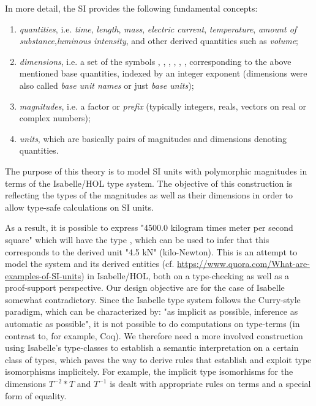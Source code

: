 \documentclass[11pt,a4paper]{book}
\begin{document}
In more detail, the SI provides the following fundamental concepts:

%
\begin{enumerate}%
\item \emph{quantities}, i.e. \emph{time}, \emph{length}, \emph{mass}, \emph{electric current},
\emph{temperature}, \emph{amount of substance},\emph{luminous intensity},
and other derived quantities such as \emph{volume};

\item \emph{dimensions}, i.e. a set of the symbols  , , , ,  \isa{{\isasymTheta}}, ,   corresponding
to the above mentioned base quantities,  indexed by an integer exponent
(dimensions were also called \emph{base unit names} or just \emph{base units});

\item \emph{magnitudes}, i.e. a factor or \emph{prefix}
(typically integers, reals, vectors on real or complex numbers);

\item \emph{units}, which are basically pairs of magnitudes and dimensions denoting quantities.
\end{enumerate}


The purpose of this theory is to model SI units with polymorphic magnitudes in terms of the
Isabelle/HOL\cite{nipkow.ea:isabelle:2002} type system. The objective of this construction is 
reflecting the types of the magnitudes as well as their dimensions in order to allow type-safe 
calculations on SI units.

As a result, it is possible to express "4500.0 kilogram times meter per second square" which will
have the type , which can be used to infer 
that this corresponds to the derived unit "4.5 kN" (kilo-Newton).  %
%
This is an attempt to model the system and its derived entities (cf.
\url{https://www.quora.com/What-are-examples-of-SI-units}) in Isabelle/HOL,
both on a type-checking as well as a proof-support perspective.
Our design objective are for the case of Isabelle somewhat contradictory.
Since the Isabelle type system follows the Curry-style paradigm, which can be 
characterized by: "as implicit as possible, inference as automatic as possible", it is not
possible to do computations on type-terms (in contrast to, for example, Coq). We therefore
need a more involved construction using Isabelle's type-classes to establish a semantic 
interpretation on a certain class of types, which paves the way to derive rules that
establish and exploit type isomorphisms implicitely. For example, the implicit
type isomorhisms for the dimensions $T^{-2} * T$ and $T^{-1}$ is dealt with appropriate
rules on terms and a special form of equality. 
\end{document}
